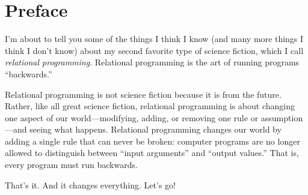 \chapter{Preface}\label{sec:preface}

I'm about to tell you some of the things I think I know (and many more
things I think I don't know) about my second favorite type of science
fiction, which I call \emph{relational programming}.  Relational
programming is the art of running programs ``backwards.''

Relational programming is not science fiction because it is from the
future.  Rather, like all great science fiction, relational
programming is about changing one aspect of our world---modifying,
adding, or removing one rule or assumption---and seeing what happens.
Relational programming changes our world by adding a single rule that
can never be broken: computer programs are no longer allowed to
distinguish between ``input arguments'' and ``output values.''  That
is, every program must run backwards.

That's it.  And it changes everything.  Let's go!
